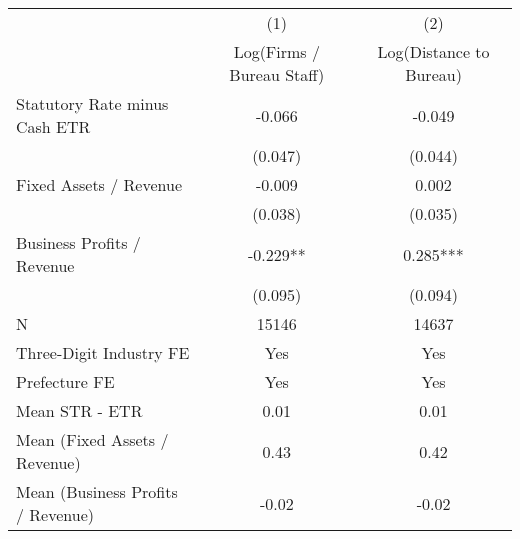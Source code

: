 \begin{tabular}{lcc}
\toprule
                    &         (1)   &         (2)   \\
                    &Log(Firms / Bureau Staff)   &Log(Distance to Bureau)    \\
\midrule
Statutory Rate minus Cash ETR&      -0.066   &      -0.049   \\
                    &     (0.047)   &     (0.044)   \\
\addlinespace
Fixed Assets / Revenue&      -0.009   &       0.002   \\
                    &     (0.038)   &     (0.035)   \\
\addlinespace
Business Profits / Revenue&      -0.229** &       0.285***\\
                    &     (0.095)   &     (0.094)   \\
\addlinespace
\midrule
N                   &       15146   &       14637   \\
Three-Digit Industry FE&         Yes   &         Yes   \\
Prefecture FE       &         Yes   &         Yes   \\
Mean STR - ETR      &        0.01   &        0.01   \\
Mean (Fixed Assets / Revenue)&        0.43   &        0.42   \\
Mean (Business Profits / Revenue)&       -0.02   &       -0.02   \\
\bottomrule
\end{tabular}
